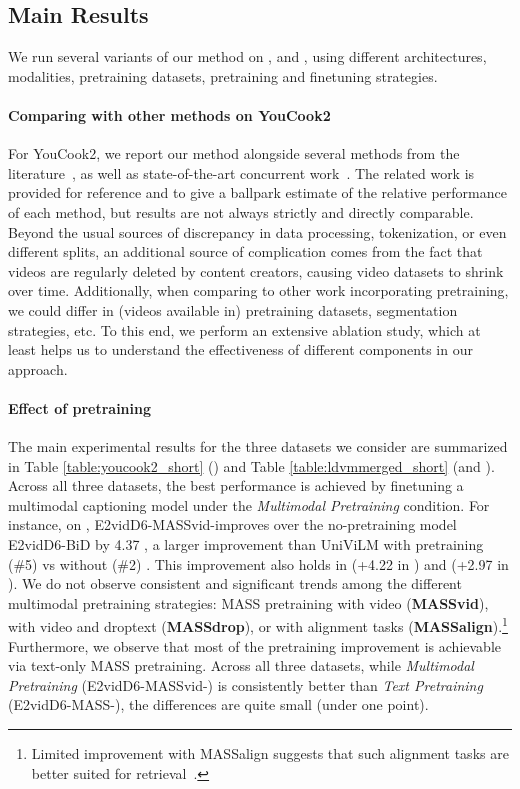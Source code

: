 \documentclass[11pt,a4paper]{article}
\begin{document}
\subsection{Main Results}

We run several variants of our method on \youcook, \ldvmmerged and \ldvmcooking, using different architectures, modalities, pretraining datasets, pretraining and finetuning strategies.


\paragraph{Comparing with other methods on YouCook2} 
For YouCook2, we report our method alongside several methods from the literature~\citep{hessel2019case,sun2019videobert,Zhou2018EndtoEndDV,Lei2020MARTMR}, as well as state-of-the-art concurrent work~\citep{luo2020univilm}.
The related work is provided for reference and to give a ballpark estimate of the relative performance of each method, but results are not always strictly and directly comparable.
Beyond the usual sources of discrepancy in data processing, tokenization, or even different splits, an additional source of complication comes from the fact that videos are regularly deleted by content creators, causing video datasets to shrink over time.
Additionally, when comparing to other work incorporating pretraining, we could differ in (videos available in) pretraining datasets, segmentation strategies, etc.
To this end, we perform an extensive ablation study, which at least helps us to understand the effectiveness of different components in our approach.

\paragraph{Effect of pretraining}
The main experimental results for the three datasets we consider are summarized in Table \ref{table:youcook2_short} (\youcook) and Table \ref{table:ldvmmerged_short} (\ldvmmerged and \ldvmcooking).
Across all three datasets, the best performance is achieved by finetuning a multimodal captioning model under the {\em Multimodal Pretraining} condition.
For instance, on \youcook, E2vidD6-MASSvid-\bimt improves over the no-pretraining model E2vidD6-BiD by 4.37 \rouge, a larger improvement than UniViLM with pretraining (\#5) vs without (\#2) \cite{luo2020univilm}. 
This improvement also holds in \ldvmcooking (+4.22 in \rouge) and \ldvmmerged (+2.97 in \rouge).  
We do not observe consistent and significant trends among the different multimodal pretraining strategies: MASS pretraining with video (\textbf{MASSvid}), with video and droptext (\textbf{MASSdrop}), or with alignment tasks (\textbf{MASSalign}).\footnote{Limited improvement with MASSalign suggests that such alignment tasks are better suited for retrieval~\citep{luo2020univilm}.}
Furthermore, we observe that most of the pretraining improvement is achievable via text-only MASS pretraining.
Across all three datasets, while {\em Multimodal Pretraining} (E2vidD6-MASSvid-\bimt) is consistently better than {\em Text Pretraining} (E2vidD6-MASS-\bimt), the differences are quite small (under one \rouge point).
\end{document}
